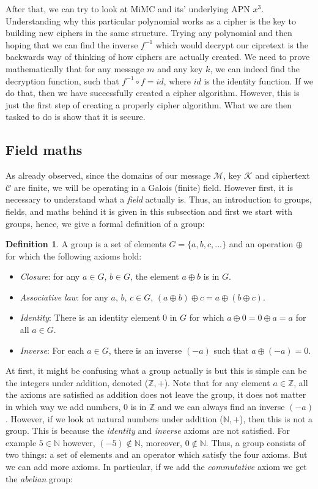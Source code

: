 \documentclass{Resources/UoBLab1}
\theoremstyle{definition}
\newtheorem{definition}[theorem]{Definition}
\begin{document}
After that, we can try to look at MiMC and its' underlying APN $x^3$. Understanding why this particular polynomial works as a cipher is the key to building new ciphers in the same structure. Trying any polynomial and then hoping that we can find the inverse $f^{-1}$ which would decrypt our cipretext is the backwards way of thinking of how ciphers are actually created. We need to prove mathematically that for any message $m$ and any key $k$, we can indeed find the decryption function, such that \(f^{-1} \circ f = id\), where $id$ is the identity function. If we do that, then we have successfully created a cipher algorithm. However, this is just the first step of creating a properly cipher algorithm. What we are then tasked to do is show that it is secure.

\subsection{Field maths}\label{sub:field-maths}
As already observed, since the domains of our message $\mathcal{M}$, key $\mathcal{K}$ and ciphertext $\mathcal{C}$ are finite, we will be operating in a Galois (finite) field. However first, it is necessary to understand what a \textit{field} actually is. Thus, an introduction to groups, fields, and maths behind it is given in this subsection and first we start with groups, hence, we give a formal definition of a group:
\begin{definition}
    A group is a set of elements $G = \{a, b, c, ...\}$ and an operation $\oplus$ for which the following axioms hold:
    \begin{itemize}
        \item \textit{Closure}: for any $a \in G$, $b \in G$, the element $a \oplus b$ is in $G$.
        \item \textit{Associative law}: for any $a$, $b$, $c \in G$, $(a \oplus b) \oplus c = a \oplus (b \oplus c)$.
        \item \textit{Identity}: There is an identity element $0$ in $G$ for which $a \oplus 0 = 0 \oplus a = a$ for all $a \in G$.
        \item \textit{Inverse}: For each $a \in G$, there is an inverse $(-a)$ such that $a \oplus (-a) = 0$.
    \end{itemize}
\end{definition}
At first, it might be confusing what a group actually is but this is simple can be the integers under addition, denoted ($\mathbb{Z}, +$). Note that for any element $a \in \mathbb{Z}$, all the axioms are satisfied as addition does not leave the group, it does not matter in which way we add numbers, $0$ is in $\mathbb{Z}$ and we can always find an inverse $(-a)$. However, if we look at natural numbers under addition ($\mathbb{N}, +$), then this is not a group. This is because the \textit{identity} and \textit{inverse} axioms are not satisfied. For example $5 \in \mathbb{N}$ however, $(-5) \notin \mathbb{N}$, moreover, $0 \notin \mathbb{N}$. Thus, a group consists of two things: a set of elements and an operator which satisfy the four axioms. But we can add more axioms. In particular, if we add the \textit{commutative} axiom we get the \textit{abelian} group:
\end{document}
